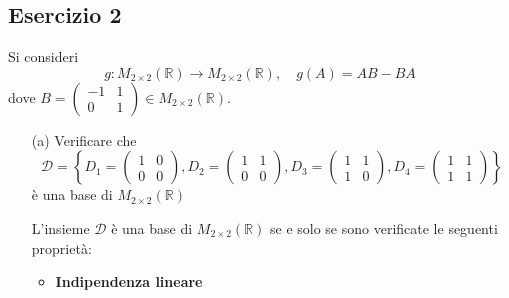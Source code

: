 \documentclass[a4paper]{article}
\theoremstyle{break}
\theoremstyle{break}
\theoremstyle{break}
\theoremstyle{break}
\begin{document}
\subsection{Esercizio 2}
Si consideri
\[
	g: M_{2 \times 2}(\mathbb{R}) \to M_{2 \times 2}(\mathbb{R}), \quad g(A) = AB - BA
\]
dove \( B = \begin{pmatrix}
	-1 & 1 \\
	0  & 1
\end{pmatrix} \in M_{2 \times 2}(\mathbb{R}) \).

\begin{enumerate}
	\item[(a)] Verificare che
	      \[
		      \mathcal{D} = \left\{
		      D_1 = \begin{pmatrix}
			      1 & 0 \\
			      0 & 0
		      \end{pmatrix} ,
		      D_2 = \begin{pmatrix}
			      1 & 1 \\
			      0 & 0
		      \end{pmatrix} ,
		      D_3 = \begin{pmatrix}
			      1 & 1 \\
			      1 & 0
		      \end{pmatrix} ,
		      D_4 = \begin{pmatrix}
			      1 & 1 \\
			      1 & 1
		      \end{pmatrix}
		      \right\}
	      \]
	      è una base di \( M_{2 \times 2}(\mathbb{R}) \)

        \vspace{1em}
        \noindent L'insieme \( \mathcal{D} \) è una base di \( M_{2 \times 2}(\mathbb{R}) \) se e solo se
        sono verificate le seguenti proprietà:
        \begin{itemize}
          \item \textbf{Indipendenza lineare}


\end{itemize}
\end{enumerate}
\end{document}
